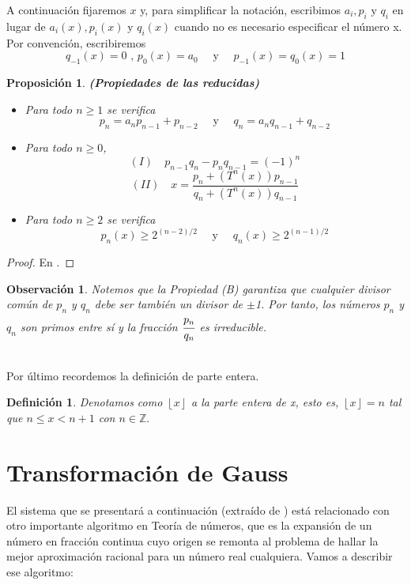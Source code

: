 \documentclass[12pt]{report}
\newtheorem{obs}{{Observación}}[section]
\newtheorem{defi}{Definición}[section]
\newtheorem{prop}{Proposición}[section]
\begin{document}
A continuación fijaremos $x$ y, para simplificar la notación, escribimos $a_{i}, p_{i} \text{ y } q_{i}$ en lugar de $a_{i}(x), p_{i}(x) \text{ y } q_{i}(x)$ cuando no es necesario especificar el número x.
\\

Por convención, escribiremos
$$
q_{-1}(x)=0\text{ , } p_{0}(x)=a_{0} \quad\text{ y }\quad p_{-1}(x)=q_{0}(x)=1
$$
\begin{prop}
\textbf{(Propiedades de las reducidas)}
\begin{itemize}
    \item[(A)] Para todo $n\geq1$ se verifica
    $$
    p_{n}=a_{n}p_{n-1}+p_{n-2} \quad \text{ y }\quad q_{n}=a_{n}q_{n-1}+q_{n-2}
    $$
    \item[(B)] Para todo $n\geq0$,
    $$(I)\quad p_{n-1}q_{n} - p_{n}q_{n-1}=(-1)^{n}$$
    $$
    (II)\quad x=\frac{p_{n} + (T^{n}(x))p_{n-1}}{q_{n}+(T^{n}(x))q_{n-1}}
    $$
    \item[(C)] Para todo $n\geq2$ se verifica 
    $$
    p_{n}(x)\geq2^{(n-2)/2} \quad\text{ y }\quad q_{n}(x)\geq2^{(n-1)/2}
    $$
\end{itemize}
\label{ProRed}
\end{prop}
\begin{proof}
En \cite{Portugues}.
\end{proof}

\begin{obs}
Notemos que la Propiedad (B) garantiza que cualquier divisor común de $p_{n}$ y $q_{n}$ debe ser también un divisor de $\pm$1. Por tanto, los números $p_{n}$ y $q_{n}$ son primos entre sí y la fracción $\cfrac{p_{n}}{q_{n}}$ es irreducible.
\end{obs}
\\
Por último recordemos la definición de parte entera.

\begin{defi}
Denotamos como $\left\lfloor x\right\rfloor$ a la parte entera de x, esto es, $\left\lfloor x\right\rfloor=n$ tal que $n \leq x< n+1$ con $n\in\mathbb{Z}.$
\end{defi}
\section{Transformación de Gauss}
El sistema que se presentará a continuación (extraído de \cite{Viana}) está relacionado con otro importante algoritmo en Teoría de números, que es la expansión de un número en fracción continua cuyo origen se remonta al problema de hallar la mejor aproximación racional para un número real cualquiera. Vamos a describir ese algoritmo:\\
\end{document}
